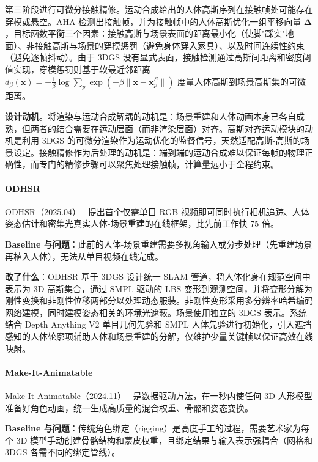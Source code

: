 第三阶段进行可微分接触精修。运动合成给出的人体高斯序列在接触帧处可能存在穿模或悬空。AHA 检测出接触帧，并为接触帧中的人体高斯优化一组平移向量 $\boldsymbol{\Delta}$，目标函数平衡三个因素：接触高斯与场景表面的距离最小化（使脚"踩实"地面）、非接触高斯与场景的穿模惩罚（避免身体穿入家具）、以及时间连续性约束（避免逐帧抖动）。由于 3DGS 没有显式表面，接触检测通过高斯间距离和密度阈值实现，穿模惩罚则基于软最近邻距离 $d_\beta(\mathbf{x}) = -\frac{1}{\beta} \log \sum_p \exp(-\beta \|\mathbf{x} - \mathbf{x}_p^S\|)$ 度量人体高斯到场景高斯集的可微距离。

\textbf{设计动机}。将渲染与运动合成解耦的动机是：场景重建和人体动画本身已各自成熟，但两者的结合需要在运动层面（而非渲染层面）对齐。高斯对齐运动模块的动机是利用 3DGS 的可微分渲染作为运动优化的监督信号，天然适配高斯-高斯的场景设定。接触精修作为后处理的动机是：端到端的运动合成难以保证每帧的物理正确性，而专门的精修步骤可以聚焦处理接触帧，计算量远小于全程约束。

\paragraph{ODHSR}

ODHSR（2025.04）~\cite{2504_13167} 提出首个仅需单目 RGB 视频即可同时执行相机追踪、人体姿态估计和密集光真实人体-场景重建的在线框架，比先前工作快 75 倍。

\textbf{Baseline 与问题}：此前的人体-场景重建需要多视角输入或分步处理（先重建场景再植入人体），无法从单目视频在线完成。

\textbf{改了什么}：ODHSR 基于 3DGS 设计统一 SLAM 管道，将人体化身在规范空间中表示为 3D 高斯集合，通过 SMPL 驱动的 LBS 变形到观测空间，并将变形分解为刚性变换和非刚性位移两部分以处理动态服装。非刚性变形采用多分辨率哈希编码网络建模，同时建模姿态相关的环境光遮蔽。场景使用独立的 3DGS 表示。系统结合 Depth Anything V2 单目几何先验和 SMPL 人体先验进行初始化，引入遮挡感知的人体轮廓项辅助人体和场景重建的分解，仅维护少量关键帧以保证高效在线映射。

\paragraph{Make-It-Animatable}

Make-It-Animatable（2024.11）~\cite{2411_18197} 是数据驱动方法，在一秒内使任何 3D 人形模型准备好角色动画，统一生成高质量的混合权重、骨骼和姿态变换。

\textbf{Baseline 与问题}：传统角色绑定（rigging）是高度手工的过程，需要艺术家为每个 3D 模型手动创建骨骼结构和蒙皮权重，且绑定结果与输入表示强耦合（网格和 3DGS 各需不同的绑定管线）。

